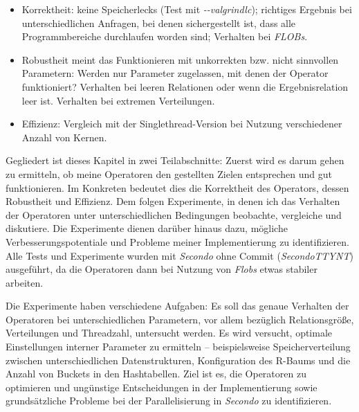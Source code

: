 \documentclass[a4paper,12pt,twoside]{article}
\newcommand{\Fb}[1]{\textit{#1}} %
\begin{document}
\begin{itemize}
	\item Korrektheit: keine Speicherlecks (Test mit \Fb{-{}-valgrindlc}); richtiges Ergebnis bei unterschiedlichen Anfragen, bei denen sichergestellt ist, dass alle Programmbereiche durchlaufen worden sind; Verhalten bei \Fb{FLOBs}.
	\item Robustheit meint das Funktionieren mit unkorrekten bzw. nicht sinnvollen Parametern: Werden nur Parameter zugelassen, mit denen der Operator funktioniert? Verhalten bei leeren Relationen oder wenn die Ergebnisrelation leer ist. Verhalten bei extremen Verteilungen.
	\item Effizienz: Vergleich mit der Singlethread-Version bei Nutzung verschiedener Anzahl von Kernen. 
\end{itemize}

Gegliedert ist dieses Kapitel in zwei Teilabschnitte: Zuerst wird es darum gehen zu ermitteln, ob meine Operatoren den gestellten Zielen entsprechen und gut funktionieren. Im Konkreten bedeutet dies die Korrektheit des Operators, dessen Robustheit und Effizienz. Dem folgen Experimente, in denen ich das Verhalten der Operatoren unter unterschiedlichen Bedingungen beobachte, vergleiche und diskutiere. Die Experimente dienen darüber hinaus dazu, mögliche Verbesserungspotentiale und Probleme meiner Implementierung zu identifizieren. Alle Tests und Experimente wurden mit \Fb{Secondo} ohne Commit (\Fb{SecondoTTYNT}) ausgeführt, da die Operatoren dann bei Nutzung von \Fb{Flobs} etwas stabiler arbeiten. 

Die Experimente haben verschiedene Aufgaben: Es soll das genaue Verhalten der Operatoren bei unterschiedlichen Parametern, vor allem bezüglich Relationsgröße, Verteilungen und Threadzahl, untersucht werden. Es wird versucht, optimale Einstellungen interner Parameter zu ermitteln -- beispielsweise Speicherverteilung zwischen unterschiedlichen Datenstrukturen, Konfiguration des R-Baums und die Anzahl von Buckets in den Hashtabellen. Ziel ist es, die Operatoren zu optimieren und ungünstige Entscheidungen in der Implementierung sowie grundsätzliche Probleme bei der Parallelisierung in \Fb{Secondo} zu identifizieren.
\end{document}
